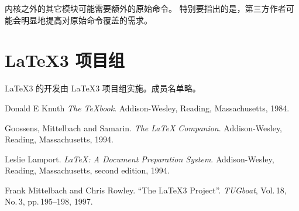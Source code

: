 \documentclass{l3doc}
\begin{document}
%
 内核之外的其它模块可能需要额外的原始命令。
特别要指出的是，第三方作者可能会明显地提高对原始命令覆盖的需求。

%
\section{\LaTeX3 项目组}
\LaTeX3 的开发由 \LaTeX3 项目组实施。成员名单略。

%
%

\begin{thebibliography}{1}

 Donald E Knuth
 \newblock \emph{The \TeX{}book}.
 \newblock Addison-Wesley, Reading, Massachusetts, 1984.

 Goossens, Mittelbach and Samarin.
 \newblock \emph{ The \LaTeX{} Companion}.
 \newblock Addison-Wesley, Reading, Massachusetts, 1994.

 Leslie Lamport.
 \newblock \emph{\LaTeX{}: A Document Preparation System}.
 \newblock Addison-Wesley, Reading, Massachusetts, second edition, 1994.

 Frank Mittelbach and Chris Rowley.
 \newblock \enquote{The \LaTeX3 Project}.
 \newblock \emph{TUGboat},
 Vol.\,18, No.\,3, pp.\,195--198, 1997.

\end{thebibliography}
\end{document}
